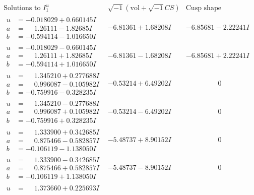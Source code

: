 \documentclass[1p]{elsarticle_modified}
\theoremstyle{definition}
\newcommand{\I}{\sqrt{-1}}
\begin{document}
$$\begin{array}{c|c|c}
\text{Solutions to }I^u_{1}& \I (\text{vol} + \sqrt{-1}CS) & \text{Cusp shape}\\
 \hline 
\begin{aligned}
u &= -0.018029 + 0.660145 I \\
a &= \phantom{-}1.26111 - 1.82685 I \\
b &= -0.594114 - 1.016650 I\end{aligned}
 & -6.81361 + 1.68208 I & -6.85681 - 2.22241 I \\ \hline\begin{aligned}
u &= -0.018029 - 0.660145 I \\
a &= \phantom{-}1.26111 + 1.82685 I \\
b &= -0.594114 + 1.016650 I\end{aligned}
 & -6.81361 - 1.68208 I & -6.85681 + 2.22241 I \\ \hline\begin{aligned}
u &= \phantom{-}1.345210 + 0.277688 I \\
a &= \phantom{-}0.996087 - 0.105982 I \\
b &= -0.759916 - 0.328235 I\end{aligned}
 & -0.53214 + 6.49202 I & \phantom{-0.000000 } 0 \\ \hline\begin{aligned}
u &= \phantom{-}1.345210 - 0.277688 I \\
a &= \phantom{-}0.996087 + 0.105982 I \\
b &= -0.759916 + 0.328235 I\end{aligned}
 & -0.53214 - 6.49202 I & \phantom{-0.000000 } 0 \\ \hline\begin{aligned}
u &= \phantom{-}1.333900 + 0.342685 I \\
a &= \phantom{-}0.875466 - 0.582857 I \\
b &= -0.106119 - 1.138050 I\end{aligned}
 & -5.48737 + 8.90152 I & \phantom{-0.000000 } 0 \\ \hline\begin{aligned}
u &= \phantom{-}1.333900 - 0.342685 I \\
a &= \phantom{-}0.875466 + 0.582857 I \\
b &= -0.106119 + 1.138050 I\end{aligned}
 & -5.48737 - 8.90152 I & \phantom{-0.000000 } 0 \\ \hline\begin{aligned}
u &= \phantom{-}1.373660 + 0.225693 I \\

\end{aligned}
\end{array}$$
\end{document}
